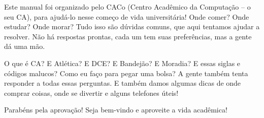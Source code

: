 Este manual foi organizado pelo CACo (Centro Acadêmico da Computação -- o seu
CA), para ajudá-lo nesse começo de vida universitária! Onde comer? Onde estudar?
Onde morar? Tudo isso são dúvidas comuns, que aqui tentamos ajudar a resolver.
Não há respostas prontas, cada um tem suas preferências, mas a gente dá uma mão.

O que é CA? E Atlética? E DCE? E Bandejão? E Moradia? E essas siglas e códigos
malucos? Como eu faço para pegar uma bolsa? A gente também tenta responder a todas
essas perguntas. E também damos algumas dicas de onde comprar coisas, onde se
divertir e alguns telefones úteis!

Parabéns pela aprovação! Seja bem-vindo e aproveite a vida acadêmica!


